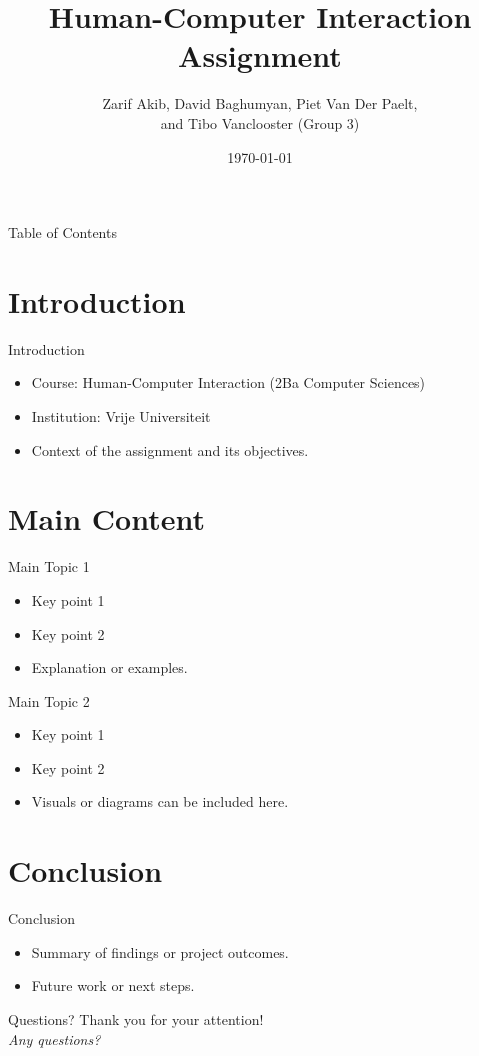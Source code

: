 \documentclass{beamer}
\title{Human-Computer Interaction Assignment}
\author{Zarif Akib, David Baghumyan, Piet Van Der Paelt, \\and Tibo Vanclooster (Group 3)}
\date{\today}
\begin{document}
\frame{\titlepage}

\begin{frame}{Table of Contents}
    \tableofcontents
\end{frame}

\section{Introduction}
\begin{frame}{Introduction}
    \begin{itemize}
        \item Course: Human-Computer Interaction (2Ba Computer Sciences)
        \item Institution: Vrije Universiteit
        \item Context of the assignment and its objectives.
    \end{itemize}
\end{frame}

\section{Main Content}
\begin{frame}{Main Topic 1}
    \begin{itemize}
        \item Key point 1
        \item Key point 2
        \item Explanation or examples.
    \end{itemize}
\end{frame}

\begin{frame}{Main Topic 2}
    \begin{itemize}
        \item Key point 1
        \item Key point 2
        \item Visuals or diagrams can be included here.
    \end{itemize}
\end{frame}

\section{Conclusion}
\begin{frame}{Conclusion}
    \begin{itemize}
        \item Summary of findings or project outcomes.
        \item Future work or next steps.
    \end{itemize}
\end{frame}

\begin{frame}{Questions?}
    \centering
    Thank you for your attention! \\
    \vspace{0.5cm}
    \textit{Any questions?}
\end{frame}
\end{document}
